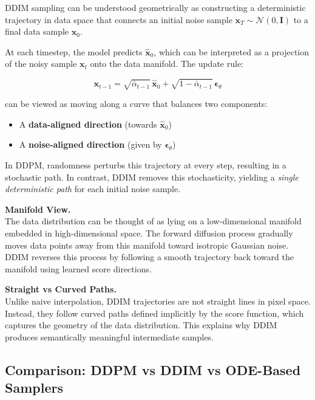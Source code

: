 DDIM sampling can be understood geometrically as constructing a deterministic trajectory in data space that connects an initial noise sample $\mathbf{x}_T \sim \mathcal{N}(0, \mathbf{I})$ to a final data sample $\mathbf{x}_0$.

At each timestep, the model predicts $\hat{\mathbf{x}}_0$, which can be interpreted as a projection of the noisy sample $\mathbf{x}_t$ onto the data manifold. The update rule:

\begin{equation}
\mathbf{x}_{t-1}
=
\sqrt{\bar{\alpha}_{t-1}}\,\hat{\mathbf{x}}_0
+
\sqrt{1 - \bar{\alpha}_{t-1}}\,\boldsymbol{\epsilon}_\theta
\end{equation}

can be viewed as moving along a curve that balances two components:
\begin{itemize}
    \item A \textbf{data-aligned direction} (towards $\hat{\mathbf{x}}_0$)
    \item A \textbf{noise-aligned direction} (given by $\boldsymbol{\epsilon}_\theta$)
\end{itemize}

In DDPM, randomness perturbs this trajectory at every step, resulting in a stochastic path. In contrast, DDIM removes this stochasticity, yielding a \textit{single deterministic path} for each initial noise sample.

\vspace{0.5em}
\noindent
\textbf{Manifold View.} \\
The data distribution can be thought of as lying on a low-dimensional manifold embedded in high-dimensional space. The forward diffusion process gradually moves data points away from this manifold toward isotropic Gaussian noise. DDIM reverses this process by following a smooth trajectory back toward the manifold using learned score directions.

\vspace{0.5em}
\noindent
\textbf{Straight vs Curved Paths.} \\
Unlike naive interpolation, DDIM trajectories are not straight lines in pixel space. Instead, they follow curved paths defined implicitly by the score function, which captures the geometry of the data distribution. This explains why DDIM produces semantically meaningful intermediate samples.

\subsection{Comparison: DDPM vs DDIM vs ODE-Based Samplers}

